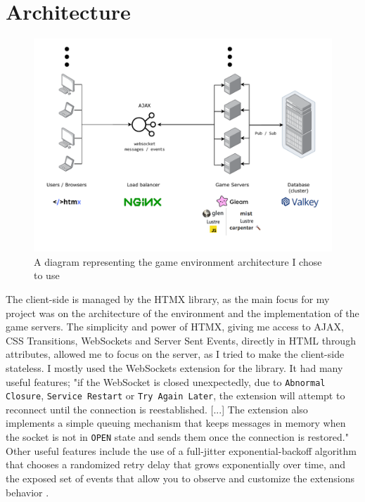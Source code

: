 \documentclass[]{final}
\begin{document}
\section{Architecture}

\begin{figure}[ht!]
  \centering
  \includegraphics[width=\linewidth]{architecture}
  \vspace*{-1.5cm}
  \caption{A diagram representing the game environment architecture I chose to use}
  \label{fig: 3}
\end{figure}

\newpage

The client-side is managed by the HTMX library, as the main focus for my project
was on the architecture of the environment and the implementation of the game
servers. The simplicity and power of HTMX, giving me access to AJAX, CSS Transitions,
WebSockets and Server Sent Events, directly in HTML through attributes,\cite{noauthor_HTMX_nodate} allowed me to
focus on the server, as I tried to make the client-side stateless. I mostly
used the WebSockets extension for the library. It had many useful features;
"if the WebSocket is closed unexpectedly, due to \lstinline|Abnormal Closure|, \lstinline|Service Restart|
or \lstinline|Try Again Later|, the extension will attempt to reconnect until the connection
is reestablished. [...] The extension also implements a simple queuing mechanism that
keeps messages in memory when the socket is not in \lstinline|OPEN| state and sends
them once the connection is restored."\cite{noauthor_HTMX_ws_nodate} Other useful features include the
use of a full-jitter exponential-backoff algorithm that chooses a randomized
retry delay that grows exponentially over time, and the exposed
set of events that allow you to observe and customize the extensions behavior
\cite{noauthor_HTMX_ws_nodate}.
\end{document}
